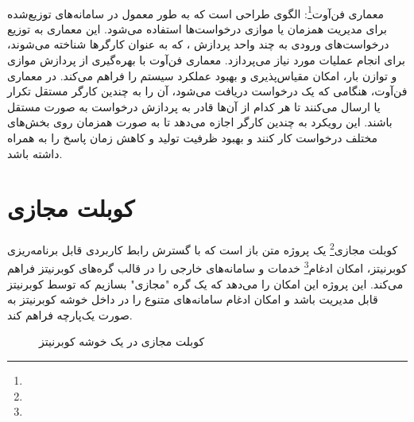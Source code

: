 \paragraph{}
{
    معماری فن‌آوت\footnote{}: الگوی طراحی است که به طور معمول در سامانه‌های توزیع‌شده برای مدیریت همزمان یا موازی درخواست‌ها استفاده می‌شود. این معماری به توزیع درخواست‌های ورودی به چند واحد پردازش ، که به عنوان کارگرها شناخته می‌شوند، برای انجام عملیات مورد نیاز می‌پردازد. معماری فن‌آوت با بهره‌گیری از پردازش موازی و توازن بار، امکان مقیاس‌پذیری و بهبود عملکرد سیستم را فراهم می‌کند. در معماری فن‌آوت، هنگامی که یک درخواست دریافت می‌شود، آن را به چندین کارگر مستقل تکرار یا ارسال می‌کنند تا هر کدام از آن‌ها قادر به پردازش درخواست به صورت مستقل باشند. این رویکرد به چندین کارگر اجازه می‌دهد تا به صورت همزمان روی بخش‌های مختلف درخواست کار کنند و بهبود ظرفیت تولید و کاهش زمان پاسخ را به همراه داشته باشد.
}

\section{کوبلت مجازی}
\label{sec:vritkubelet}
\paragraph{}
{
    کوبلت مجازی\footnote{} یک پروژه متن باز است که با گسترش رابط‌ کاربردی قابل برنامه‌ریزی کوبرنیتز، امکان ادغام\footnote{} خدمات و سامانه‌های خارجی را در قالب گره‌های کوبرنیتز فراهم می‌کند. این پروژه این امکان را می‌دهد که یک گره "مجازی" بسازیم که توسط کوبرنیتز قابل مدیریت باشد و امکان ادغام سامانه‌های متنوع را در داخل خوشه کوبرنیتز به صورت یک‌پارچه فراهم کند.    
    \begin{figure}[H]
     \caption{کوبلت مجازی در یک خوشه کوبرنیتز}
     \label{fig:virtkublet_arch}
    \end{figure}
}

